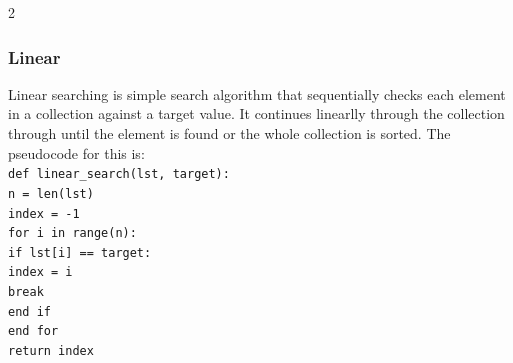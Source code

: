 \documentclass[a4paper]{report}
\begin{document}
\begin{flushleft}
\begin{multicols}{2}
	\subsubsection*{Linear}
	Linear searching is simple search algorithm that sequentially checks each element in a collection against a target value. It continues linearlly through the collection through until the element is found or the whole collection is sorted. The pseudocode for this is:\\
	\texttt{def linear\_search(lst, target):}\\
		\hspace{2em}\texttt{n = len(lst)}\\
		\hspace{2em}\texttt{index = -1}\\
		\hspace{2em}\texttt{for i in range(n):}\\
			\hspace{4em}\texttt{if lst[i] == target:}\\
				\hspace{6em}\texttt{index = i}\\
				\hspace{6em}\texttt{break}\\
			\hspace{4em}\texttt{end if}\\
		\hspace{2em}\texttt{end for}\\
		\hspace{2em}\texttt{return index}
	\hfill\break\break

\end{multicols}
\end{flushleft}
\end{document}
